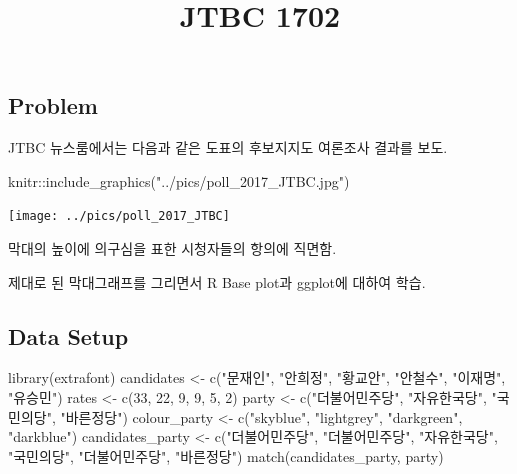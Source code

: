 \documentclass[
]{article}
\title{JTBC 1702}
\author{}
\date{\vspace{-2.5em}}
\newenvironment{Shaded}{}{}
\newcommand{\DecValTok}[1]{\textcolor[rgb]{0.25,0.63,0.44}{#1}}
\newcommand{\FunctionTok}[1]{\textcolor[rgb]{0.02,0.16,0.49}{#1}}
\newcommand{\NormalTok}[1]{#1}
\newcommand{\OtherTok}[1]{\textcolor[rgb]{0.00,0.44,0.13}{#1}}
\newcommand{\SpecialCharTok}[1]{\textcolor[rgb]{0.25,0.44,0.63}{#1}}
\newcommand{\StringTok}[1]{\textcolor[rgb]{0.25,0.44,0.63}{#1}}
\begin{document}
\maketitle

\subsection{Problem}\label{problem}

JTBC 뉴스룸에서는 다음과 같은 도표의 후보지지도 여론조사 결과를 보도.

\begin{Shaded}
\begin{Highlighting}[]
\NormalTok{knitr}\SpecialCharTok{::}\FunctionTok{include\_graphics}\NormalTok{(}\StringTok{"../pics/poll\_2017\_JTBC.jpg"}\NormalTok{)}
\end{Highlighting}
\end{Shaded}

\begin{center}\texttt{[image: ../pics/poll\_2017\_JTBC]} \end{center}

막대의 높이에 의구심을 표한 시청자들의 항의에 직면함.

제대로 된 막대그래프를 그리면서 R Base plot과 ggplot에 대하여 학습.

\subsection{Data Setup}\label{data-setup}

\begin{Shaded}
\begin{Highlighting}[]
\FunctionTok{library}\NormalTok{(extrafont)}
\NormalTok{candidates }\OtherTok{\textless{}{-}} \FunctionTok{c}\NormalTok{(}\StringTok{"문재인"}\NormalTok{, }\StringTok{"안희정"}\NormalTok{, }\StringTok{"황교안"}\NormalTok{, }\StringTok{"안철수"}\NormalTok{, }\StringTok{"이재명"}\NormalTok{, }\StringTok{"유승민"}\NormalTok{) }
\NormalTok{rates }\OtherTok{\textless{}{-}} \FunctionTok{c}\NormalTok{(}\DecValTok{33}\NormalTok{, }\DecValTok{22}\NormalTok{, }\DecValTok{9}\NormalTok{, }\DecValTok{9}\NormalTok{, }\DecValTok{5}\NormalTok{, }\DecValTok{2}\NormalTok{)}
\NormalTok{party }\OtherTok{\textless{}{-}} \FunctionTok{c}\NormalTok{(}\StringTok{"더불어민주당"}\NormalTok{, }\StringTok{"자유한국당"}\NormalTok{, }\StringTok{"국민의당"}\NormalTok{, }\StringTok{"바른정당"}\NormalTok{)}
\NormalTok{colour\_party }\OtherTok{\textless{}{-}} \FunctionTok{c}\NormalTok{(}\StringTok{"skyblue"}\NormalTok{, }\StringTok{"lightgrey"}\NormalTok{, }\StringTok{"darkgreen"}\NormalTok{, }\StringTok{"darkblue"}\NormalTok{)}
\NormalTok{candidates\_party }\OtherTok{\textless{}{-}}  \FunctionTok{c}\NormalTok{(}\StringTok{"더불어민주당"}\NormalTok{, }\StringTok{"더불어민주당"}\NormalTok{, }\StringTok{"자유한국당"}\NormalTok{, }
                       \StringTok{"국민의당"}\NormalTok{, }\StringTok{"더불어민주당"}\NormalTok{, }\StringTok{"바른정당"}\NormalTok{)}
\FunctionTok{match}\NormalTok{(candidates\_party, party)}
\end{Highlighting}
\end{Shaded}
\end{document}

